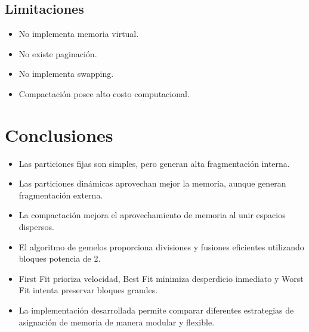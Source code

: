 
\subsection{Limitaciones}

\begin{itemize}
    \item No implementa memoria virtual.
    
    \item No existe paginación.
    
    \item No implementa swapping.
    
    \item Compactación posee alto costo computacional.
\end{itemize}


\section{Conclusiones}

\begin{itemize}
    \item Las particiones fijas son simples, pero generan alta fragmentación interna.
    
    \item Las particiones dinámicas aprovechan mejor la memoria, aunque generan fragmentación externa.
    
    \item La compactación mejora el aprovechamiento de memoria al unir espacios dispersos.
    
    \item El algoritmo de gemelos proporciona divisiones y fusiones eficientes utilizando bloques potencia de 2.
    
    \item First Fit prioriza velocidad, Best Fit minimiza desperdicio inmediato y Worst Fit intenta preservar bloques grandes.
    
    \item La implementación desarrollada permite comparar diferentes estrategias de asignación de memoria de manera modular y flexible.
\end{itemize}


